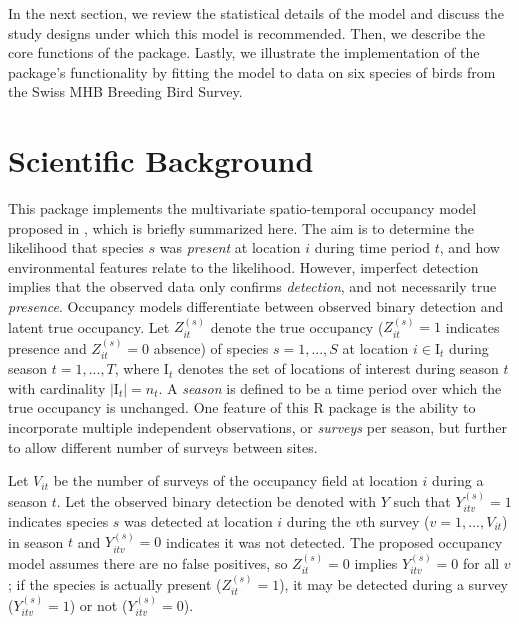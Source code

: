 In the next section, we review the statistical details of the model and discuss the study designs under which this model is recommended. Then, we describe the core functions of the  package. Lastly, we illustrate the implementation of the package's functionality by fitting the model to data on six species of birds from the Swiss MHB Breeding Bird Survey.


\section{Scientific Background}

This package implements the multivariate spatio-temporal occupancy model proposed in \citet{hepler2021spatiotemporal}, which is briefly summarized here. The aim is to determine the likelihood that species $s$ was \textit{present} at location $i$ during time period $t$, and how environmental features relate to the likelihood. However, imperfect detection implies that the observed data only confirms \textit{detection}, and not necessarily true \textit{presence}. Occupancy models differentiate between observed binary detection and latent true occupancy. Let $Z_{it}^{(s)}$ denote the true occupancy ($Z_{it}^{(s)}=1$ indicates presence and $Z_{it}^{(s)}=0$ absence) of species $s=1,...,S$ at location $i\in \mathrm{I}_t$ during season $t=1,...,T$, where $\mathrm{I}_t$ denotes the set of locations of interest during season $t$ with cardinality $|\mathrm{I}_t|=n_t$. A \textit{season} is defined to be a time period over which the true occupancy is unchanged.  One feature of this R package is the ability to incorporate multiple independent observations, or \textit{surveys} per season, but further to allow different number of surveys between sites.

Let $V_{it}$ be the number of surveys of the occupancy field at location $i$ during a season $t$. Let the observed binary detection be denoted with $Y$ such that $Y_{itv}^{(s)}=1$ indicates species $s$ was detected at location $i$ during the $v$th survey ($v=1,...,V_{it}$) in season $t$ and $Y_{itv}^{(s)}=0$ indicates it was not detected. The proposed occupancy model assumes there are no false positives, so $Z_{it}^{(s)}=0$ implies $Y_{itv}^{(s)}=0$ for all $v$; if the species is actually present ($Z_{it}^{(s)}=1$), it may be detected during a survey ($Y_{itv}^{(s)}=1$) or not ($Y_{itv}^{(s)}=0$). 


